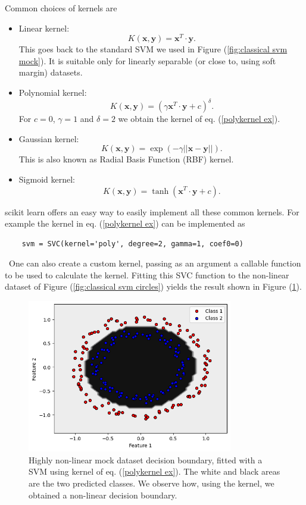 \documentclass[12pt]{article}
\begin{document}
Common choices of kernels are
\begin{itemize}
    \item Linear kernel: $$K(\mathbf{x},\mathbf{y})=\mathbf{x}^T\cdot\mathbf{y}.$$ This goes back to the standard SVM we used in Figure (\ref{fig:classical svm mock}). It is suitable only for linearly separable (or close to, using soft margin) datasets.
    \item Polynomial kernel: $$K(\mathbf{x},\mathbf{y})=(\gamma\mathbf{x}^T\cdot\mathbf{y}+c)^\delta.$$ For $c=0$, $\gamma=1$ and $\delta=2$ we obtain the kernel of eq. (\ref{polykernel ex}). 
    \item Gaussian kernel: $$K(\mathbf{x},\mathbf{y})=\exp(-\gamma||\mathbf{x}-\mathbf{y}||).$$ This is also known as Radial Basis Function (RBF) kernel. 
    \item Sigmoid kernel: $$K(\mathbf{x},\mathbf{y})=\tanh(\mathbf{x}^T\cdot\mathbf{y}+c).$$
\end{itemize}
scikit learn offers an easy way to easily implement all these common kernels. For example the kernel in eq. (\ref{polykernel ex}) can be implemented as 
\begin{lstlisting}
    svm = SVC(kernel='poly', degree=2, gamma=1, coef0=0)
\end{lstlisting}\
One can also create a custom kernel, passing as an argument a callable function to be used to calculate the kernel. Fitting this SVC function to the non-linear dataset of Figure (\ref{fig:classical svm circles}) yields the result shown in Figure (\ref{fig:classical svm circle decision boundary}). 
\begin{figure}[h!]
    \centering
    \includegraphics[width=0.8\textwidth]{images/circlesclassicaldecisionboundary.png}
    \caption{Highly non-linear mock dataset decision boundary, fitted with a SVM using kernel of eq. (\ref{polykernel ex}). The white and black areas are the two predicted classes. We observe how, using the kernel, we obtained a non-linear decision boundary.}
    \label{fig:classical svm circle decision boundary}
\end{figure}
\newpage
\end{document}
